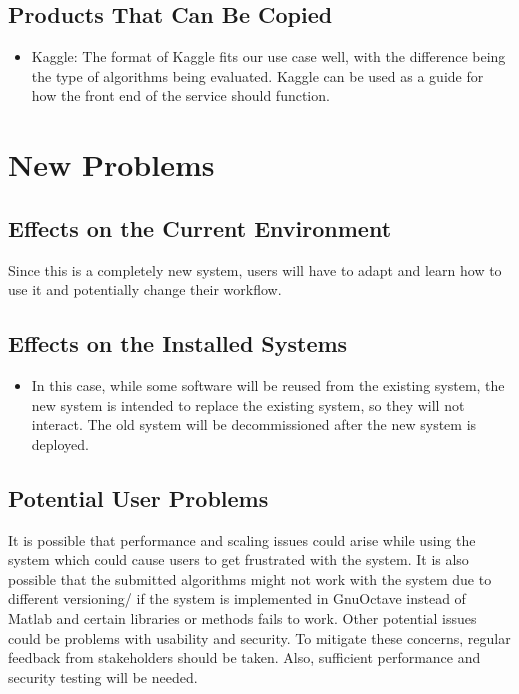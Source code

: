 \documentclass[12pt]{article}
\begin{document}
\subsection{Products That Can Be Copied}
\begin{itemize}
    \item Kaggle: The format of Kaggle fits our use case well, with the difference being the type of algorithms being evaluated. Kaggle can be used as a guide for how the front end of the service should function.
\end{itemize}

\section{New Problems}
\subsection{Effects on the Current Environment}
Since this is a completely new system, users will have to adapt and learn how to use it and potentially change their workflow. 
\subsection{Effects on the Installed Systems}
\begin{itemize}
    \item In this case, while some software will be reused from the existing system, the new system is intended to replace the existing system, so they will not interact. The old system will be decommissioned after the new system is deployed.
\end{itemize}

\subsection{Potential User Problems}
It is possible that performance and scaling issues could arise while using the system which could cause users to get frustrated with the system. It is also possible that the submitted algorithms might not work with the system due to different versioning/ if the system is implemented in GnuOctave instead of Matlab and certain libraries or methods fails to work. Other potential issues could be problems with usability and security. To mitigate these concerns, regular feedback from stakeholders should be taken. Also, sufficient performance and security testing will be needed.
\end{document}
